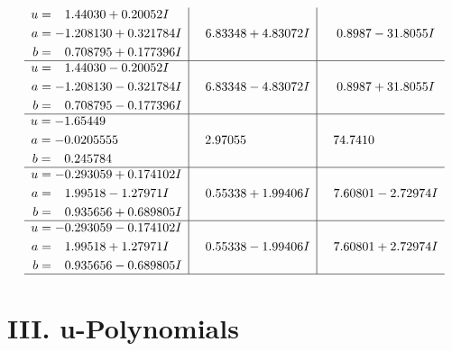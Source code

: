\documentclass[1p]{elsarticle_modified}
\theoremstyle{definition}
\begin{document}
$$\begin{array}{c|c|c}
\begin{aligned}
u &= \phantom{-}1.44030 + 0.20052 I \\
a &= -1.208130 + 0.321784 I \\
b &= \phantom{-}0.708795 + 0.177396 I\end{aligned}
 & \phantom{-}6.83348 + 4.83072 I & \phantom{-}0.8987 - 31.8055 I \\ \hline\begin{aligned}
u &= \phantom{-}1.44030 - 0.20052 I \\
a &= -1.208130 - 0.321784 I \\
b &= \phantom{-}0.708795 - 0.177396 I\end{aligned}
 & \phantom{-}6.83348 - 4.83072 I & \phantom{-}0.8987 + 31.8055 I \\ \hline\begin{aligned}
u &= -1.65449\phantom{ +0.000000I} \\
a &= -0.0205555\phantom{ +0.000000I} \\
b &= \phantom{-}0.245784\phantom{ +0.000000I}\end{aligned}
 & \phantom{-}2.97055\phantom{ +0.000000I} & \phantom{-}74.7410\phantom{ +0.000000I} \\ \hline\begin{aligned}
u &= -0.293059 + 0.174102 I \\
a &= \phantom{-}1.99518 - 1.27971 I \\
b &= \phantom{-}0.935656 + 0.689805 I\end{aligned}
 & \phantom{-}0.55338 + 1.99406 I & \phantom{-}7.60801 - 2.72974 I \\ \hline\begin{aligned}
u &= -0.293059 - 0.174102 I \\
a &= \phantom{-}1.99518 + 1.27971 I \\
b &= \phantom{-}0.935656 - 0.689805 I\end{aligned}
 & \phantom{-}0.55338 - 1.99406 I & \phantom{-}7.60801 + 2.72974 I\\
 \hline 
 \end{array}$$\newpage
\newpage\renewcommand{\arraystretch}{1}
\centering \section*{ III. u-Polynomials}
\end{document}
